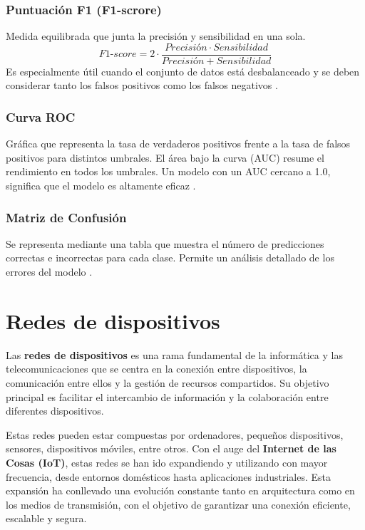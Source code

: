 \subsubsection{Puntuación F1 (F1-scrore)}
\label{subsubsec:F1Score}
Medida equilibrada que junta la precisión y sensibilidad en una sola.
\[\textit{F1-score} = 2 \cdot \frac{Precisión \cdot Sensibilidad}{Precisión + Sensibilidad}\]
Es especialmente útil cuando el conjunto de datos está desbalanceado y se deben considerar tanto los falsos positivos como los falsos negativos \cite{metricas}.

\subsubsection{Curva ROC}
\label{subsubsec:RocCurve}
Gráfica que representa la tasa de verdaderos positivos frente a la tasa de falsos positivos para distintos umbrales. El área bajo la curva (AUC) resume el rendimiento en todos los umbrales. Un modelo con un AUC cercano a 1.0, significa que el modelo es altamente eficaz \cite{roc}.

\subsubsection{Matriz de Confusión}
\label{subsubsec:MatrizConfusion}
Se representa mediante una tabla que muestra el número de predicciones correctas e incorrectas para cada clase. Permite un análisis detallado de los errores del modelo \cite{matriz}.


\section{Redes de dispositivos}
\label{sec:Redes}
Las \textbf{redes de dispositivos} es una rama fundamental de la informática y las telecomunicaciones que se centra en la conexión entre dispositivos, la comunicación entre ellos y la gestión de recursos compartidos. Su objetivo principal es facilitar el intercambio de información y la colaboración entre diferentes dispositivos.

Estas redes pueden estar compuestas por ordenadores, pequeños dispositivos, sensores, dispositivos móviles, entre otros. Con el auge del \textbf{Internet de las Cosas (IoT)}, estas redes se han ido expandiendo y utilizando con mayor frecuencia, desde entornos domésticos hasta aplicaciones industriales. Esta expansión ha conllevado una evolución constante tanto en arquitectura como en los medios de transmisión, con el objetivo de garantizar una conexión eficiente, escalable y segura.

